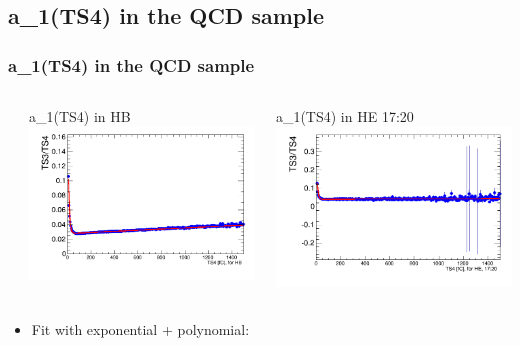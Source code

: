 \documentclass[bigger]{beamer}
\begin{document}
\subsection{a\_1(TS4) in the QCD sample}
\label{sec-3-3}
\begin{frame}
\frametitle{a\_1(TS4) in the QCD sample}
\label{sec-3-3-1}
\begin{columns} %
\label{sec-3-3-1-1}
\begin{column}{0.55\textwidth}
\label{sec-3-3-1-1-1}

\centering
a\_1(TS4) in HB
\includegraphics[width=\textwidth]{fig/a0_ring0.png}
\end{column}
\begin{column}{0.55\textwidth}
\label{sec-3-3-1-1-2}

\centering
a\_1(TS4) in HE 17:20
\includegraphics[width=\textwidth]{fig/a0_ring1.png}
\end{column}
\end{columns}
\label{sec-3-3-1-2}
\begin{itemize}

\item Fit with exponential + polynomial:\\
\label{sec-3-3-1-2-1}%
\end{itemize} %
\end{frame}
\end{document}
